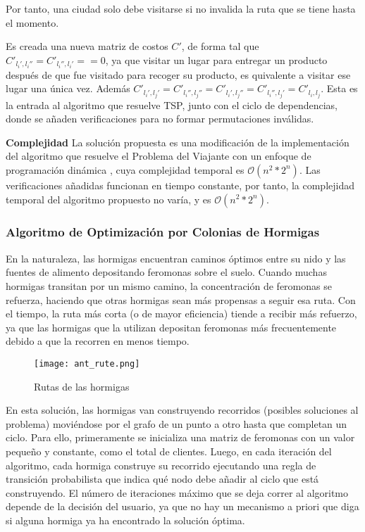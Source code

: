 \documentclass[twocolumn, fontsize=10pt]{article}
\theoremstyle{definition} %
\begin{document}
Por tanto, una ciudad solo debe visitarse si no invalida la ruta que se tiene hasta el momento.

Es creada una nueva matriz de costos \(C'\), de forma tal que \(C'_{l_i',l_i''}=C'_{l_i'',l_i'}==0\), ya que visitar un lugar para entregar un producto después de que fue visitado para recoger su producto, es quivalente a visitar ese lugar una única vez. Además \(C'_{l_i',l_j'}=C'_{l_i'',l_j''}=C'_{l_i',l_j''}=C'_{l_i'',l_j'}=C'_{l_i,l_j}\). Esta es la entrada al algoritmo que resuelve TSP, junto con el ciclo de dependencias, donde se añaden verificaciones para no formar permutaciones inválidas. 

\textbf{Complejidad}
La solución propuesta es una modificación de la implementación del algoritmo que resuelve el Problema del Viajante con un enfoque de programación dinámica \cite{geeksforgeeks_tsp_using_dp}, cuya complejidad temporal es \(\mathcal{O}(n^2*2^n)\). Las verificaciones añadidas funcionan en tiempo constante, por tanto, la complejidad temporal del algoritmo propuesto no varía, y es \(\mathcal{O}(n^2*2^n)\). 
 

\subsubsection{Algoritmo de Optimización por Colonias de Hormigas}

En la naturaleza, las hormigas encuentran caminos óptimos entre su nido y las fuentes de alimento depositando feromonas sobre el suelo. Cuando muchas hormigas transitan por un mismo camino, la concentración de feromonas se refuerza, haciendo que otras hormigas sean más propensas a seguir esa ruta. Con el tiempo, la ruta más corta (o de mayor eficiencia) tiende a recibir más refuerzo, ya que las hormigas que la utilizan depositan feromonas más frecuentemente debido a que la recorren en menos tiempo.

\begin{figure}[h]
    \centering
    \texttt{[image: ant\_rute.png]}
    \caption{Rutas de las hormigas}
    \label{fig:gadget}
\end{figure}

 En esta solución, las hormigas van construyendo recorridos (posibles soluciones al problema) moviéndose por el grafo de un punto a otro hasta que completan un ciclo. Para ello, primeramente se inicializa una matriz de feromonas con un valor pequeño y constante, como el total de  clientes. Luego, en cada iteración del algoritmo, cada hormiga construye su recorrido ejecutando una regla de transición probabilista que indica qué nodo debe añadir al ciclo que está construyendo. El número de iteraciones máximo que se deja correr al algoritmo depende de la decisión del usuario, ya que no hay un mecanismo a priori que diga si alguna hormiga ya ha encontrado la solución óptima. \cite{ant}
\end{document}
